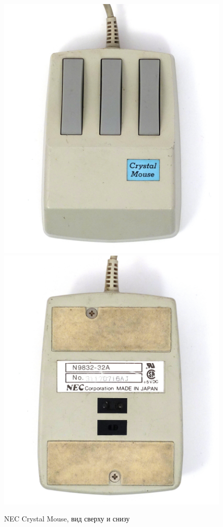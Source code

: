 \documentclass[11pt, a4paper]{article}
\begin{document}
\begin{figure}[h]
    \centering
    \includegraphics[scale=0.6]{1986_nec_crystal_mouse/nectop_60.jpg}
    \includegraphics[scale=0.6]{1986_nec_crystal_mouse/necbottom_60.jpg}
    \caption{NEC Crystal Mouse, вид сверху и снизу}
    \label{NecCrystalTopAndBottom}
\end{figure}
\end{document}
